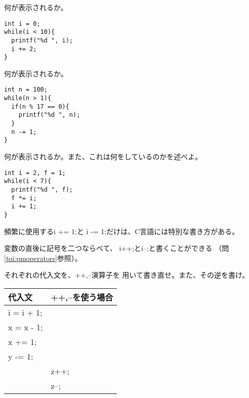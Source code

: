 \documentclass[12pt,a4j]{jarticle}
\newcounter{toi}
\def\toi{%
\bigskip\bigskip\noindent
\addtocounter{toi}{1}
\shadowbox{\bfseries\large 問\thetoi}
\nopagebreak[4]\bigskip\nopagebreak[4]
}
\begin{document}




\toi

何が表示されるか。
\begin{verbatim}
int i = 0;
while(i < 10){
  printf("%d ", i);
  i += 2;
}
\end{verbatim}






\toi

何が表示されるか。
\begin{verbatim}
int n = 100;
while(n > 1){
  if(n % 17 == 0){
    printf("%d ", n);
  }
  n -= 1;
}
\end{verbatim}




\toi

何が表示されるか。また、これは何をしているのかを述べよ。
\begin{verbatim}
int i = 2, f = 1;
while(i < 7){
  printf("%d ", f);
  f *= i;
  i += 1;
}
\end{verbatim}






\toi

頻繁に使用する{\ttfamily i += 1;}と
{\ttfamily i -= 1;}だけは、C言語には特別な書き方がある。

変数の直後に記号を二つならべて、
{\ttfamily i++;}と{\ttfamily i--;}と書くことができる
（問\ref{toi:pmoperators}参照）。



それぞれの代入文を、{\ttfamily ++,--}演算子を
用いて書き直せ。また、その逆を書け。
\begin{center}\ttfamily
\begin{tabular}{|l|l|}\hline
 代入文 & {\ttfamily ++,--}を使う場合\\\hline\hline
 i = i + 1;& \\\hline
 x = x - 1;& \\\hline
 x += 1;& \\\hline
 y -= 1;& \\\hline
 & z++;\\\hline
 & z--;\\\hline
\end{tabular}
\end{center}
\end{document}

